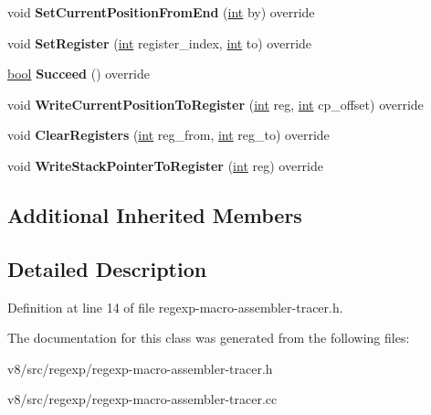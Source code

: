 \begin{DoxyCompactItemize}
\item 
\mbox{\label{classv8_1_1internal_1_1RegExpMacroAssemblerTracer_aa9c127b8e476f621ccc63dd971d71800}} 
void {\bfseries Set\+Current\+Position\+From\+End} (\mbox{\hyperlink{classint}{int}} by) override
\item 
\mbox{\label{classv8_1_1internal_1_1RegExpMacroAssemblerTracer_a071ff70027d402b7d4cf026bec4b378a}} 
void {\bfseries Set\+Register} (\mbox{\hyperlink{classint}{int}} register\+\_\+index, \mbox{\hyperlink{classint}{int}} to) override
\item 
\mbox{\label{classv8_1_1internal_1_1RegExpMacroAssemblerTracer_a3f36f07f3140a501c727692e74c3b58e}} 
\mbox{\hyperlink{classbool}{bool}} {\bfseries Succeed} () override
\item 
\mbox{\label{classv8_1_1internal_1_1RegExpMacroAssemblerTracer_a1c35d06d23287b461c2f665d7a17950c}} 
void {\bfseries Write\+Current\+Position\+To\+Register} (\mbox{\hyperlink{classint}{int}} reg, \mbox{\hyperlink{classint}{int}} cp\+\_\+offset) override
\item 
\mbox{\label{classv8_1_1internal_1_1RegExpMacroAssemblerTracer_a261b9c61cfcbc6ab5eb1760bf5be431a}} 
void {\bfseries Clear\+Registers} (\mbox{\hyperlink{classint}{int}} reg\+\_\+from, \mbox{\hyperlink{classint}{int}} reg\+\_\+to) override
\item 
\mbox{\label{classv8_1_1internal_1_1RegExpMacroAssemblerTracer_a56f1a3f6aefde895fa11c518dae92efa}} 
void {\bfseries Write\+Stack\+Pointer\+To\+Register} (\mbox{\hyperlink{classint}{int}} reg) override
\end{DoxyCompactItemize}
\subsection*{Additional Inherited Members}


\subsection{Detailed Description}


Definition at line 14 of file regexp-\/macro-\/assembler-\/tracer.\+h.



The documentation for this class was generated from the following files\+:\begin{DoxyCompactItemize}
\item 
v8/src/regexp/regexp-\/macro-\/assembler-\/tracer.\+h\item 
v8/src/regexp/regexp-\/macro-\/assembler-\/tracer.\+cc\end{DoxyCompactItemize}
